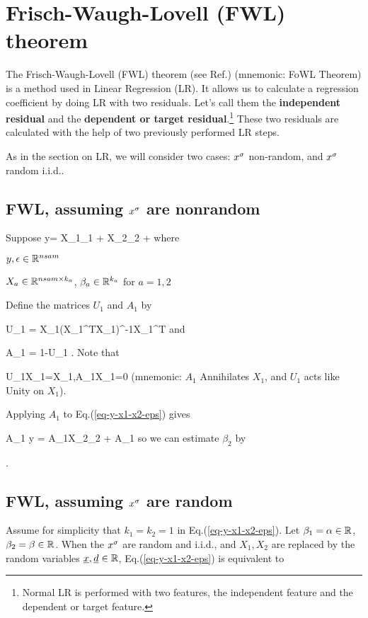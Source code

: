 \chapter{Frisch-Waugh-Lovell (FWL) theorem}
\label{ch-fwl-theo}

The Frisch-Waugh-Lovell (FWL) theorem
(see Ref.\cite{wiki-fwl-theo})
(mnemonic: FoWL Theorem)
is a method used in Linear Regression (LR).
It allows us to
calculate
a regression coefficient
by doing LR with two residuals. Let's call them
the {\bf independent residual} and the
{\bf dependent or target residual}.\footnote{Normal 
LR is performed with two features,
the independent feature and the dependent or target feature.}
These  two residuals are calculated 
with the help of two previously
performed LR steps.

As in the section 
on LR, we will consider
two cases: $x^\sigma$ non-random, and $x^\sigma$ random i.i.d..

\section{FWL, assuming $x^\sigma$ are nonrandom}
Suppose
\beq
y=  X_1\beta_1 + X_2\beta_2 + \eps
\label{eq-y-x1-x2-eps}
\eeq
where

$y, \epsilon\in { \mathbb{R}}^{nsam}$

$X_a\in { \mathbb{R}}^{nsam\times k_a}$,
$\beta_a\in { \mathbb{R}}^{k_a}$ for $a=1,2$

Define the matrices $U_1$ and $A_1$ by

\beq
U_1 = X_1(X_1^TX_1)^{-1}X_1^T
\eeq
and

\beq
A_1 = 1-U_1
\;.
\eeq
Note that

\beq
U_1X_1=X_1\;,\;\;A_1X_1=0
\eeq
(mnemonic: $A_1$ Annihilates $X_1$,
and $U_1$ acts like Unity on $X_1$).

Applying $A_1$ to Eq.(\ref{eq-y-x1-x2-eps}) gives

\beq
A_1 y = A_1X_2\beta_2  + A_1\eps
\eeq
so we can estimate $\beta_2$ by

\beq
{}
\label{eq-fwl-nonrand}
\;.
\eeq
\section{FWL, assuming $x^\sigma$ are random}


Assume for simplicity that 
$k_1=k_2=1$
in Eq.(\ref{eq-y-x1-x2-eps}). Let
$\beta_1=\alpha\in{ \mathbb{R}}$, 
$\beta_2=\beta\in{ \mathbb{R}}$.
When the $x^\sigma$ are random and i.i.d.,
and
$X_1, X_2$ are
replaced by 
the random variables
${\underline{x}}, {\underline{d}}\in { \mathbb{R}}$,
Eq.(\ref{eq-y-x1-x2-eps})
is equivalent to


